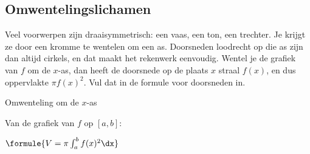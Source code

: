 \begin{oefeningen}
\end{oefeningen}

\subsection{Omwentelingslichamen}

Veel voorwerpen zijn draaisymmetrisch: een vaas, een ton, een trechter. Je krijgt ze door een kromme te wentelen om een as. Doorsneden loodrecht op die as zijn dan altijd cirkels, en dat maakt het rekenwerk eenvoudig. Wentel je de grafiek van $f$ om de $x$-as, dan heeft de doorsnede op de plaats $x$ straal $f(x)$, en dus oppervlakte $\pi f(x)^2$. Vul dat in de formule voor doorsneden in.

\begin{theorie}
\begin{stelling}{Omwenteling om de $x$-as}
\begin{minipage}[t]{.60\linewidth}
\vspace{0pt}
Van de grafiek van $f$ op $[a, b]$:

\vspace{1mm}
\qquad $\formule{V = \pi \int_a^b f(x)^2\dx}$
\end{minipage}\hfill
\begin{minipage}[t]{.36\linewidth}
\vspace{0pt}
\end{minipage}
\end{stelling}
\end{theorie}

